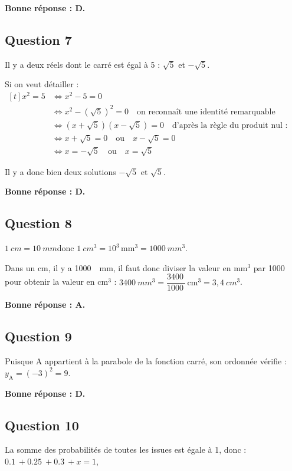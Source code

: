 \documentclass[10pt]{article}
\providecommand{\np}[2][]{{#2~#1}}
\begin{document}
	\textbf{Bonne réponse : D.}

\subsection*{Question 7}
	Il y a deux réels dont le carré est égal à 5 : \quad $\sqrt{5}$ et $-\sqrt{5}$.

	Si on veut détailler :\quad $\begin{aligned}[t]
		x^2 = 5
		&\iff x^2 - 5 = 0\\
		&\iff x^2 - \left(\sqrt{5}\right)^2 = 0\quad \text{on reconnaît une identité remarquable}\\
		&\iff \left(x+\sqrt5\right)\left(x-\sqrt5\right) = 0\quad\text{d'après la règle du produit nul :}\\
		&\iff x+\sqrt5 = 0 \quad \text{ou}\quad x-\sqrt5=0\\
		&\iff x=-\sqrt5 \quad \text{ou}\quad x =\sqrt5
	\end{aligned}$

	Il y a donc bien deux solutions $-\sqrt5\text{ et }\sqrt5$.

	\textbf{Bonne réponse : D.}

\subsection*{Question 8}
	$\np[cm]{1} = \np[mm]{10}$\quad donc \quad $\np[cm^3]{1} = 10^3\,\text{mm}^3 = \np[mm^3]{1000}$.

	Dans un cm, il y a \np{1000}~mm, il faut donc diviser la valeur en mm$^3$ par \np{1000} pour obtenir la valeur en cm$^3$ :
	\quad
	$\np[mm^3]{3400} = \dfrac{\np{3400}}{\np{1000}}\,\text{cm}^3 = \np[cm^3]{3,4}$.

	\textbf{Bonne réponse : A.}

\subsection*{Question 9}
	Puisque A appartient à la parabole de la fonction carré, son ordonnée vérifie :\quad $y_\text{A} = (-3)^2 = 9$.

	\textbf{Bonne réponse : D.}

\subsection*{Question 10}
	La somme des probabilités de toutes les issues est égale à 1, donc : \quad  $\np{0.1}+\np{0.25}+\np{0.3}+x = 1$,
\end{document}
